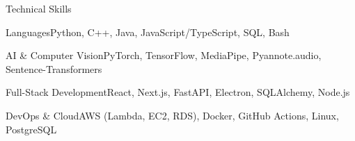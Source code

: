 \documentclass[
	11pt
]{../resume}
\begin{document}
	\begin{rSection}{T}{echnical Skills}
		\begin{rSet}{Languages}{Python, C++, Java, JavaScript/TypeScript, SQL, Bash}
		\end{rSet}
		\begin{rSet}{AI \& Computer Vision}{PyTorch, TensorFlow, MediaPipe, Pyannote.audio, Sentence-Transformers}
		\end{rSet}
		\begin{rSet}{Full-Stack Development}{React, Next.js, FastAPI, Electron, SQLAlchemy, Node.js}
		\end{rSet}
		\begin{rSet}{DevOps \& Cloud}{AWS (Lambda, EC2, RDS), Docker, GitHub Actions, Linux, PostgreSQL}
		\end{rSet}
	\end{rSection}
\end{document}
